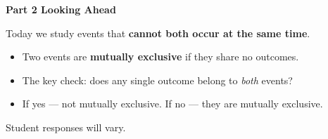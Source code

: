 \documentclass[10pt]{article}
\begin{document}
\vspace{0.3in}

{\large\bfseries\color{navy} Part 2 \quad Looking Ahead}

\vspace{0.12in}

\noindent Today we study events that \textbf{cannot both occur at the same time}.

\vspace{0.14in}

\begin{tcolorbox}[colback=greenbg, colframe=greenacc, boxrule=0.8pt, arc=2mm,
    left=4mm, right=4mm, top=3mm, bottom=3mm]
    \small
    \begin{itemize}[leftmargin=1.3em, itemsep=8pt]
      \item Two events are \textbf{mutually exclusive} if they share no outcomes.
      \item The key check: does any single outcome belong to \emph{both} events?
      \item If yes --- not mutually exclusive. If no --- they are mutually exclusive.
    \end{itemize}
\end{tcolorbox}

\vspace{0.2in}

\noindent\textcolor{slate}{\small Student responses will vary.}
\end{document}
